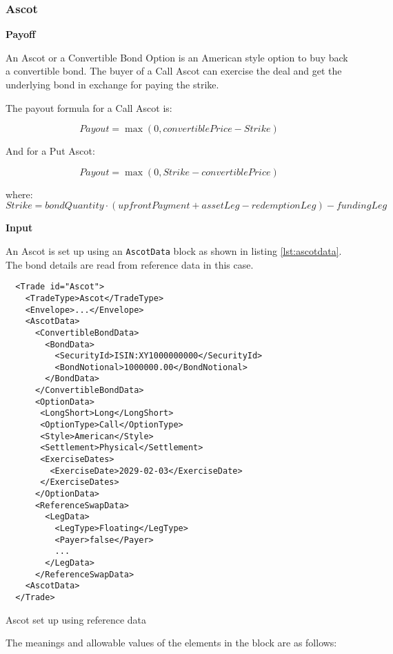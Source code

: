 \subsubsection{Ascot}
\label{ss:ascot}

{\bf Payoff}

An Ascot or a Convertible Bond Option is an American style  option to buy back a convertible bond. The buyer of a Call Ascot can exercise the deal and get the underlying bond in
exchange for paying the strike.

The payout formula for a Call Ascot is:

$$
Payout = \max(0, convertiblePrice - Strike)
$$

And for a Put Ascot:

$$
Payout = \max(0, Strike - convertiblePrice)
$$

where: 
$$
Strike = bondQuantity \cdot (upfrontPayment + assetLeg - redemptionLeg) - fundingLeg
$$

{\bf Input}

An Ascot is set up using an {\tt AscotData} block as shown in listing
\ref{lst:ascotdata}. The bond details are read from reference data in this case.

\begin{listing}[H]
\begin{verbatim}
  <Trade id="Ascot">
    <TradeType>Ascot</TradeType>
    <Envelope>...</Envelope>
    <AscotData>
      <ConvertibleBondData>
        <BondData>
          <SecurityId>ISIN:XY1000000000</SecurityId>
          <BondNotional>1000000.00</BondNotional>
        </BondData>
      </ConvertibleBondData>
      <OptionData>
       <LongShort>Long</LongShort>
       <OptionType>Call</OptionType>
       <Style>American</Style>
       <Settlement>Physical</Settlement>
       <ExerciseDates>
         <ExerciseDate>2029-02-03</ExerciseDate>
       </ExerciseDates>  
      </OptionData>
      <ReferenceSwapData>
        <LegData>
          <LegType>Floating</LegType>
          <Payer>false</Payer>
          ...
        </LegData>
      </ReferenceSwapData>
    <AscotData>
  </Trade>
\end{verbatim}
\caption{Ascot set up using reference data}
\label{lst:ascotdata}
\end{listing}

The meanings and allowable values of the elements in the block are as follows:

